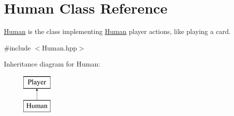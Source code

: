 \hypertarget{classHuman}{\section{Human Class Reference}
\label{classHuman}
}


\hyperlink{classHuman}{Human} is the class implementing \hyperlink{classHuman}{Human} player actions, like playing a card.  




{\ttfamily \#include $<$Human.\-hpp$>$}

Inheritance diagram for Human\-:\begin{figure}[H]
\begin{center}
\leavevmode
\includegraphics[height=2.000000cm]{classHuman}
\end{center}
\end{figure}
